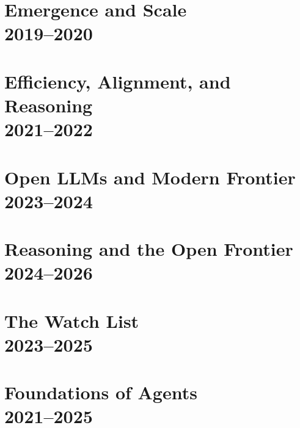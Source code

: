 \documentclass[11pt,twoside,openany]{book}
\begin{document}
\part[Emergence and Scale]{Emergence and Scale\texorpdfstring{\\}{, }2019--2020}


\part[Efficiency, Alignment, and Reasoning]{Efficiency, Alignment, and Reasoning\texorpdfstring{\\}{, }2021--2022}


\part[Open LLMs and Modern Frontier]{Open LLMs and Modern Frontier\texorpdfstring{\\}{, }2023--2024}


\part[Reasoning and the Open Frontier]{Reasoning and the Open Frontier\texorpdfstring{\\}{, }2024--2026}


\appendix
\setcounter{part}{0}
\renewcommand{\thepart}{\Alph{part}}
\renewcommand{\theHpart}{appendix.\Alph{part}}
\renewcommand{\partname}{Appendix}

\part[The Watch List]{The Watch List\texorpdfstring{\\}{, }2023--2025}


\part[Foundations of Agents]{Foundations of Agents\texorpdfstring{\\}{, }2021--2025}

\end{document}
